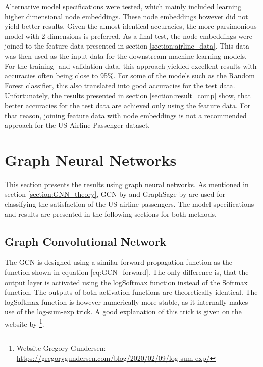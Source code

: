   \noindent Alternative model specifications were tested, which mainly included
  learning higher dimensional node embeddings. These node embeddings however
  did not yield better results. Given the almost identical accuracies, the more
  parsimonious model with 2 dimensions is preferred. As a final test, the node
  embeddings were joined to the feature data presented in section 
  \ref{section:airline_data}. This data was then used as the input data for the
  downstream machine learning models. For the training- and validation data,
  this approach yielded excellent results with accuracies often being close to 
  95\%. For some of the models such as the Random Forest classifier, this also
  translated into good accuracies for the test data. Unfortunately, the results 
  presented in section \ref{section:result_comp} show, that better accuracies
  for the test data are achieved only using the feature data. For that reason, 
  joining feature data with node embeddings is not a recommended approach for 
  the US Airline Passenger dataset.

  \section{Graph Neural Networks}

  This section presents the results using graph neural networks. As
  mentioned in section \ref{section:GNN_theory}, GCN by \cite{kipf2016semi} and
  GraphSage by \cite{hamilton2017inductive} are used for classifying the
  satisfaction of the US airline passengers. The model specifications 
  and results are presented in the following sections for both methods.

  \subsection{Graph Convolutional Network}
  \label{section:GCN_results}

  The GCN is designed using a similar forward propagation function as the
  function shown in equation \ref{eq:GCN_forward}. The only difference is, that
  the output layer is activated using the logSoftmax function instead of the
  Softmax function. The outputs of both activation functions are theoretically 
  identical. The logSoftmax function is however numerically more stable, as it 
  internally makes use of the log-sum-exp trick. A good explanation of this
  trick is given on the website by \cite{gundersen2020}\footnote{Website 
  Gregory Gundersen: \\\url{https://gregorygundersen.com/blog/2020/02/09/log-sum-exp/}}.

